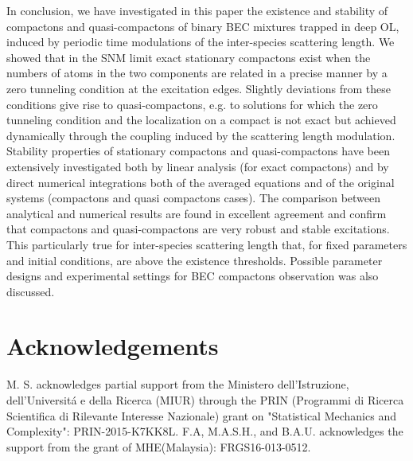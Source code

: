 \documentclass[12pt]{iopart}
\begin{document}
In conclusion, we have investigated in this paper the existence and stability of compactons and   quasi-compactons of binary BEC mixtures trapped in deep OL, induced by periodic time modulations of the inter-species scattering length. We showed that in the SNM limit exact stationary
compactons exist when the numbers of atoms in the two components are related  in a precise manner by a zero tunneling condition at the excitation edges. Slightly deviations from these conditions give rise to quasi-compactons, e.g. to solutions for which the zero tunneling condition and the localization on a compact is not exact but achieved dynamically through the coupling induced by the scattering length modulation. Stability properties of stationary compactons and
quasi-compactons have been extensively investigated both by linear analysis (for exact compactons)  and
by direct numerical integrations both of the averaged equations and of the original systems (compactons and quasi compactons cases). The comparison between analytical and numerical results are found in excellent agreement and confirm that compactons and
quasi-compactons  are very robust and  stable excitations. This particularly true for  inter-species scattering length that, for fixed parameters and initial conditions, are above the existence thresholds. Possible parameter designs and  experimental settings for BEC compactons observation was also discussed.


\section*{Acknowledgements}
M. S. acknowledges partial support from the Ministero dell'Istruzione,
dell'Universit\'a e della Ricerca (MIUR) through the PRIN (Programmi di
Ricerca Scientifica di Rilevante Interesse Nazionale) grant on
"Statistical Mechanics and Complexity": PRIN-2015-K7KK8L.
F.A, M.A.S.H., and B.A.U. acknowledges the support from the grant of MHE(Malaysia):
FRGS16-013-0512.\\
\end{document}
